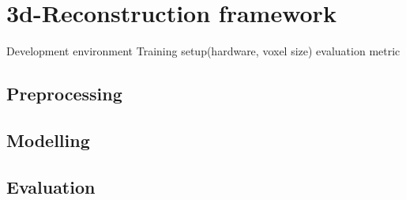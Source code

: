 \section{3d-Reconstruction framework}\label{sec:3d-reconstruction-framework}

Development environment
Training setup(hardware, voxel size)
evaluation metric

\subsection{Preprocessing}

\subsection{Modelling}

\subsection{Evaluation}
